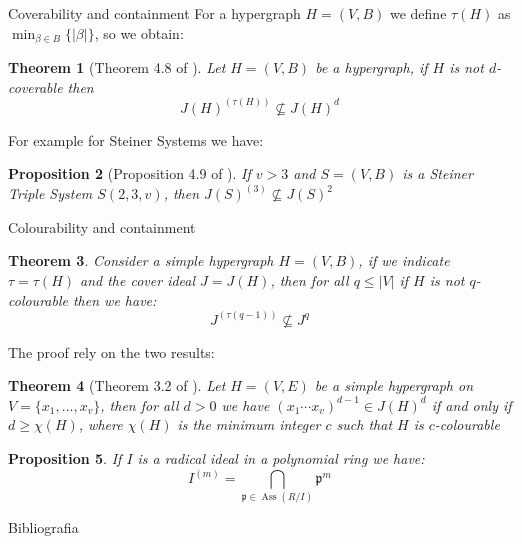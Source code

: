 \documentclass[dvipsnames]{beamer}
\theoremstyle{plain}
\newtheorem{teo}{Theorem}[section]
\newtheorem{prop}[teo]{Proposition}
\theoremstyle{remark}
\theoremstyle{definition}
\newcommand{\p}{\mathfrak{p}}
\newcommand{\mm}{\mathfrak{m}}
\DeclareMathOperator{\Ass}{Ass}
\begin{document}
\begin{frame}{Coverability and containment}
For a hypergraph $ H = (V,B) $ we define $ \tau (H) $ as $ \min_{\beta \in B} \{ |\beta |\}$, so we obtain:
\begin{teo}[Theorem 4.8 of \cite{Bal21Steiner}] \label{teo:col:cont}
Let $ H = (V,B) $ be a hypergraph, if $ H $ is not $ d $-coverable then 
\[ J(H)^{(\tau(H))} \not \subseteq J(H)^d \]
\end{teo}
For example for Steiner Systems we have:
\begin{prop}[Proposition 4.9 of \cite{Bal21Steiner}]
If $ v>3 $ and $ S = (V,B) $ is a Steiner Triple System $ S(2,3,v) $, then $ J(S)^{(3)}  \not \subseteq J(S)^2$
\end{prop}
\end{frame}

\begin{frame}{Colourability and containment}
\begin{teo} \label{teo:borin1}
	Consider a simple hypergraph $H = (V,B)$, if we indicate $\tau = \tau (H)$ and the cover ideal $ J = J(H)$,  then for all $ q \leq |V|$ if $ H $ is not $ q $-colourable then we have: 
 \[J^{( \tau(q-1) )} \not \subseteq J^q \]
\end{teo}
\end{frame}

\begin{frame}
The proof rely on the two results:
\begin{teo}[Theorem 3.2 of \cite{Fran10Colourings}] \label{teo:col:chi}
Let $ H = (V,E) $ be a simple hypergraph on $ V = \{ x_1 , ... , x_v\} $, then for all $ d >0 $ we have $ (x_1 \cdots x_v)^{d-1} \in J(H)^d $ if and only if $ d \geq \chi(H) $, where $ \chi(H) $ is the minimum integer $ c $ such that $ H $ is $ c $-colourable
\end{teo}
\begin{prop}\label{teo:sym_radical}
If $ I $ is a radical ideal in a polynomial ring we have:
\begin{equation}
		I^{(m)} = \bigcap_{\p \in \Ass(R/I) } \p^m
	\end{equation}
\end{prop}
\end{frame}

\begin{frame}[allowframebreaks]{Bibliografia}
			\printbibliography[heading=none, notcategory=fullcited]	
\end{frame}
\end{document}
